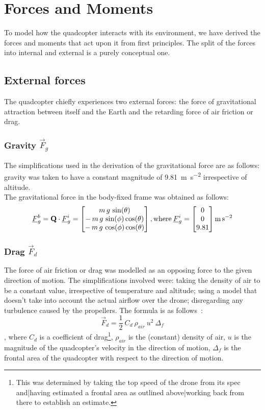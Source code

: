 \section{Forces and Moments}
To model how the quadcopter interacts with its environment, we have derived the forces and moments that act upon it from first principles. The split of the forces into internal and external is a purely conceptual one.
\subsection{External forces}
The quadcopter chiefly experiences two external forces: the force of gravitational attraction between itself and the Earth and the retarding force of air friction or drag.
\subsubsection{Gravity $\vec{F}_g$}
The simplifications used in the derivation of the gravitational force are as follows: gravity was taken to have a constant magnitude of  \SI{9.81}{\metre\per\second\squared} irrespective of altitude.
\\
The gravitational force in the body-fixed frame was obtained as follows:
$$
\underline{F}_g^b = \textbf{Q}\cdot\underline{F}_g^i = \begin{bmatrix}
m\,g\,\sin(\theta)\\-\,m\,g\,\sin(\phi)\cos(\theta)\\-\,m\,g\,\cos(\phi)\cos(\theta)
\end{bmatrix}
\mathrm{, where }\:
\underline{F}_g^i = \begin{bmatrix}
0\\0\\9.81
\end{bmatrix}
\si{\metre\per\second\squared}
$$
\subsubsection{Drag $\vec{F}_d$}
The force of air friction or drag was modelled as an opposing force to the given direction of motion. The simplifications involved were: taking the density of air to be a constant value, irrespective of temperature and altitude; using a model that doesn't take into account the actual airflow over the drone; disregarding any turbulence caused by the propellers. The formula is as follows~:
\begin{equation}
\label{eqn:drag}
\vec{F}_d = \frac{1}{2}\:C_d\:\rho_{air}\:u^2\:\Delta_f
\end{equation}
, where $C_d$ is a coefficient of drag\footnote{This was determined by taking the top speed of the drone from its spec \cite{drone-spec} and|having estimated a frontal area as outlined above|working back from there to establish an estimate. }, $\rho_{air}$ is the (constant) density of air, $u$ is the magnitude of the quadcopter's velocity in the direction of motion, $\Delta_f$ is the frontal area of the quadcopter with respect to the direction of motion.

